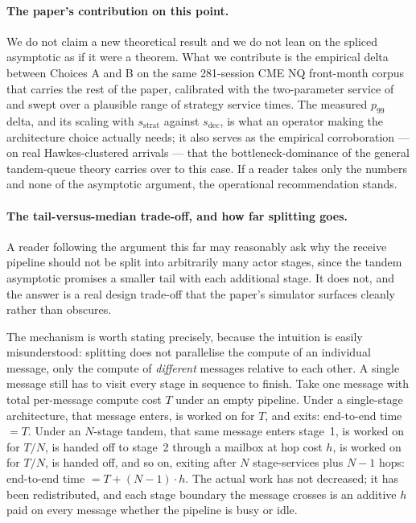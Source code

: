 \documentclass[11pt]{article}
\begin{document}
\paragraph{The paper's contribution on this point.} We do not claim a new theoretical result and we do not lean on the spliced asymptotic as if it were a theorem. What we contribute is the empirical delta between Choices A and B on the same 281-session CME NQ front-month corpus that carries the rest of the paper, calibrated with the two-parameter service of \citet{mayeski_actorhft} and swept over a plausible range of strategy service times. The measured $p_{99}$ delta, and its scaling with $s_{\mathrm{strat}}$ against $s_{\mathrm{dec}}$, is what an operator making the architecture choice actually needs; it also serves as the empirical corroboration --- on real Hawkes-clustered arrivals --- that the bottleneck-dominance of the general tandem-queue theory carries over to this case. If a reader takes only the numbers and none of the asymptotic argument, the operational recommendation stands.

\paragraph{The tail-versus-median trade-off, and how far splitting goes.} A reader following the argument this far may reasonably ask why the receive pipeline should not be split into arbitrarily many actor stages, since the tandem asymptotic promises a smaller tail with each additional stage. It does not, and the answer is a real design trade-off that the paper's simulator surfaces cleanly rather than obscures.

The mechanism is worth stating precisely, because the intuition is easily misunderstood: splitting does not parallelise the compute of an individual message, only the compute of \emph{different} messages relative to each other. A single message still has to visit every stage in sequence to finish. Take one message with total per-message compute cost $T$ under an empty pipeline. Under a single-stage architecture, that message enters, is worked on for $T$, and exits: end-to-end time $= T$. Under an $N$-stage tandem, that same message enters stage~1, is worked on for $T/N$, is handed off to stage~2 through a mailbox at hop cost $h$, is worked on for $T/N$, is handed off, and so on, exiting after $N$ stage-services plus $N-1$ hops: end-to-end time $= T + (N-1)\cdot h$. The actual work has not decreased; it has been redistributed, and each stage boundary the message crosses is an additive $h$ paid on every message whether the pipeline is busy or idle.
\end{document}
